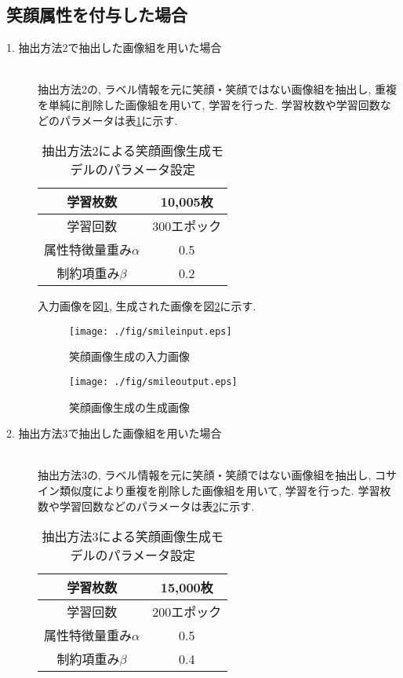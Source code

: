 \subsection{笑顔属性を付与した場合}
\begin{description}
 \item[1. 抽出方法2で抽出した画像組を用いた場合]\mbox{}\\ 
抽出方法2の, ラベル情報を元に笑顔・笑顔ではない画像組を抽出し, 重複を単純に削除した画像組を用いて, 学習を行った. 学習枚数や学習回数などのパラメータは表\ref{tab:smile1param}に示す. 
\begin{table}[H]
  \begin{center}
    \caption{抽出方法2による笑顔画像生成モデルのパラメータ設定}
    \begin{tabular}{|c|c|} \hline
      学習枚数 & 10,005枚  \\ \hline
      学習回数 & 300エポック  \\ \hline
      属性特徴量重み$\alpha$ & 0.5  \\ \hline
      制約項重み$\beta$ & 0.2  \\ \hline
    \end{tabular}
    \label{tab:smile1param}
  \end{center}
\end{table}

入力画像を図\ref{fig:smileinput}, 生成された画像を図\ref{fig:smileoutput}に示す. 

\begin{figure}[H]
 	\begin{center}
 		\texttt{[image: ./fig/smileinput.eps]}
 		\caption{笑顔画像生成の入力画像}
 		\label{fig:smileinput}
 	\end{center}
\end{figure}
\begin{figure}[H]
 	\begin{center}
 		\texttt{[image: ./fig/smileoutput.eps]}
 		\caption{笑顔画像生成の生成画像}
 		\label{fig:smileoutput}
 	\end{center}
\end{figure}

 \item[2. 抽出方法3で抽出した画像組を用いた場合]\mbox{}\\ 
抽出方法3の, ラベル情報を元に笑顔・笑顔ではない画像組を抽出し, コサイン類似度により重複を削除した画像組を用いて, 学習を行った. 学習枚数や学習回数などのパラメータは表\ref{tab:smile2param}に示す. 
\begin{table}[H]
  \begin{center}
    \caption{抽出方法3による笑顔画像生成モデルのパラメータ設定}
    \begin{tabular}{|c|c|} \hline
      学習枚数 & 15,000枚  \\ \hline
      学習回数 & 200エポック  \\ \hline
      属性特徴量重み$\alpha$ & 0.5  \\ \hline
      制約項重み$\beta$ & 0.4  \\ \hline
    \end{tabular}
    \label{tab:smile2param}
  \end{center}
\end{table}


\end{description}
